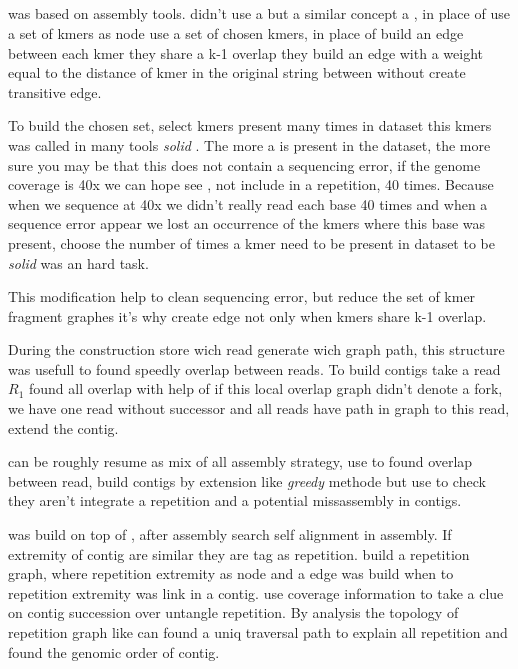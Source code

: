 \documentclass[main]{subfiles}
\begin{document}
\subsection{\flye}

\flye\cite{Flye} was based on \abruijn\cite{abruijn} assembly tools. \abruijn didn't use a \DBG but a similar concept a , in place of use a set of kmers as node  use a set of chosen kmers, in place of build an edge between each kmer they share a k-1 overlap they build an edge with a weight equal to the distance of kmer in the original string between without create transitive edge.

To build the chosen \kmers set, \abruijn select kmers present many times in dataset this kmers was called in many tools \textit{solid} \kmers {} . The more a \kmers is present in the dataset, the more sure you may be that this \kmers does not contain a sequencing error, if the genome coverage is 40x we can hope see \kmer, not include in a repetition, 40 times. Because when we sequence at 40x we didn't really read each base 40 times and when a sequence error appear we lost an occurrence of the kmers where this base was present, choose the number of times a kmer need to be present in dataset to be \textit{solid} was an hard task.

This modification help to clean sequencing error, but reduce the set of kmer fragment \DBG graphes it's why  create edge not only when kmers share k-1 overlap. 

During the  construction \abruijn store wich read generate wich graph path, this structure was usefull to found speedly overlap between reads. To build contigs \abruijn take a read $R_1$ found all overlap with help of  if this local overlap graph didn't denote a fork, we have one read without successor and all reads have path in graph to this read, \abruijn extend the contig.

\abruijn can be roughly resume as mix of all assembly strategy, use \DBG to found overlap between read, build contigs by extension like \textit{greedy} methode but use \OLC to check they aren't integrate a repetition and a potential missassembly in contigs.

\flye was build on top of \abruijn, after \abruijn assembly \flye search self alignment in assembly. If extremity of contig are similar they are tag as repetition. \flye build a repetition graph, where repetition extremity as node and a edge was build when to repetition extremity was link in a contig. \flye use coverage information to take a clue on contig succession over untangle repetition. By analysis the topology of repetition graph \flye like \hinge\cite{hinge} can found a uniq traversal path to explain all repetition and found the genomic order of contig.
\end{document}
